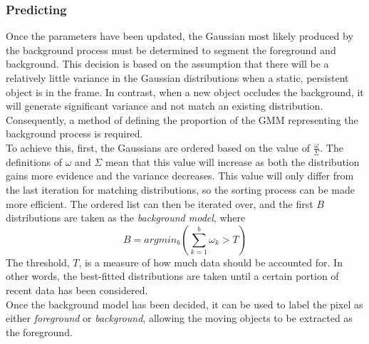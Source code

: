 \subsubsection{Predicting}
\setlength{\leftskip}{0.5cm}
\indent \indent
Once the parameters have been updated, the Gaussian most likely produced by the background process must be determined to segment the foreground and background. This decision is based on the assumption that there will be a relatively little variance in the Gaussian distributions when a static, persistent object is in the frame. In contrast, when a new object occludes the background, it will generate significant variance and not match an existing distribution. Consequently, a method of defining the proportion of the GMM representing the background process is required.
\smallskip \\ \indent
To achieve this, first, the Gaussians are ordered based on the value of $\frac{\omega}{\Sigma}$. The definitions of $\omega$ and $\Sigma$ mean that this value will increase as both the distribution gains more evidence and the variance decreases. This value will only differ from the last iteration for matching distributions, so the sorting process can be made more efficient. The ordered list can then be iterated over, and the first $B$ distributions are taken as the \textit{background model}, where
\begin{equation}
    \label{eq:gmmInequality}
    B = argmin_b \left( \sum^b_{k=1} \omega_k > T \right)
\end{equation}
The threshold, $T$, is a measure of how much data should be accounted for. In other words, the best-fitted distributions are taken until a certain portion of recent data has been considered. 
\smallskip \\ \indent
Once the background model has been decided, it can be used to label the pixel as either \textit{foreground} or \textit{background}, allowing the moving objects to be extracted as the foreground.

\setlength{\leftskip}{0cm}
